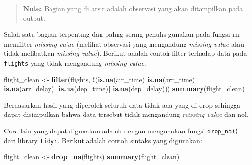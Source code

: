\documentclass[]{book}
\newenvironment{Shaded}{\begin{snugshade}}{\end{snugshade}}
\newcommand{\KeywordTok}[1]{\textcolor[rgb]{0.13,0.29,0.53}{\textbf{#1}}}
\newcommand{\StringTok}[1]{\textcolor[rgb]{0.31,0.60,0.02}{#1}}
\newcommand{\OperatorTok}[1]{\textcolor[rgb]{0.81,0.36,0.00}{\textbf{#1}}}
\newcommand{\NormalTok}[1]{#1}
\begin{document}
\begin{quote}
\textbf{Note: } Bagian yang di arsir adalah observasi yang akan
ditampilkan pada output.
\end{quote}

Salah satu bagian terpenting dan paling sering penulis gunakan pada
fungsi ini memfilter \emph{missing value} (melihat observasi yang
mengandung \emph{missing value} atau tidak melibatkan \emph{missing
value}). Berikut adalah contoh filter terhadap data pada
\texttt{flights} yang tidak mengandung \emph{missing value}.

\begin{Shaded}
\begin{Highlighting}[]
\NormalTok{flight_clean <-}\StringTok{ }\KeywordTok{filter}\NormalTok{(flights,}
                \OperatorTok{!}\NormalTok{(}\KeywordTok{is.na}\NormalTok{(air_time)}\OperatorTok{|}\KeywordTok{is.na}\NormalTok{(arr_time)}\OperatorTok{|}
\StringTok{                    }\KeywordTok{is.na}\NormalTok{(arr_delay)}\OperatorTok{|}
\StringTok{                    }\KeywordTok{is.na}\NormalTok{(dep_time)}\OperatorTok{|}
\StringTok{                    }\KeywordTok{is.na}\NormalTok{(dep_delay)))}
\KeywordTok{summary}\NormalTok{(flight_clean)}
\end{Highlighting}
\end{Shaded}

Berdasarkan hasil yang diperoleh seluruh data tidak ada yang di drop
sehingga dapat disimpulkan bahwa data tersebut tidak mengandung
\emph{missing value} dan nol.

Cara lain yang dapat digunakan adalah dengan mengunakan fungsi
\texttt{drop\_na()} dari library \texttt{tidyr}. Berikut adalah contoh
sintaks yang digunakan:

\begin{Shaded}
\begin{Highlighting}[]
\NormalTok{flight_clean <-}\StringTok{ }\KeywordTok{drop_na}\NormalTok{(flights)}
\KeywordTok{summary}\NormalTok{(flight_clean)}
\end{Highlighting}
\end{Shaded}
\end{document}
